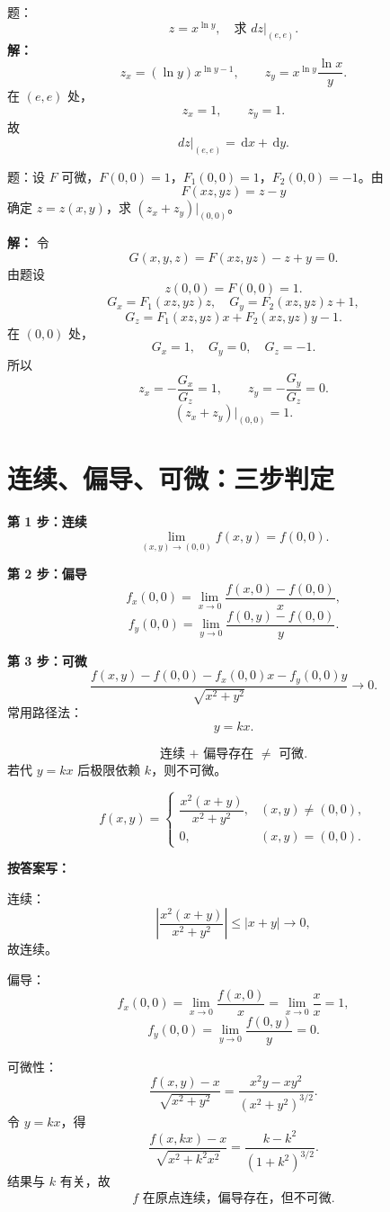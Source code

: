 \documentclass[11pt,a4paper,UTF8]{ctexart}
\newcommand{\dd}{\,\mathrm d}
\begin{document}
\begin{answerbox}[2023--2024 简答 5]
题：
\[
z=x^{\ln y},\quad \text{求 }dz\big|_{(e,e)}.
\]
\textbf{解：}
\[
z_x=(\ln y)x^{\ln y-1},\qquad
z_y=x^{\ln y}\frac{\ln x}{y}.
\]
在 \((e,e)\) 处，
\[
z_x=1,\qquad z_y=1.
\]
故
\[
\boxed{dz\big|_{(e,e)}=\dd x+\dd y}.
\]
\end{answerbox}

\begin{answerbox}[2020--2021 计算 4：隐函数一阶偏导]
题：设 \(F\) 可微，\(F(0,0)=1\)，\(F_1(0,0)=1\)，\(F_2(0,0)=-1\)。由
\[
F(xz,yz)=z-y
\]
确定 \(z=z(x,y)\)，求 \((z_x+z_y)|_{(0,0)}\)。

\textbf{解：}
令
\[
G(x,y,z)=F(xz,yz)-z+y=0.
\]
由题设
\[
z(0,0)=F(0,0)=1.
\]
\[
G_x=F_1(xz,yz)z,\quad
G_y=F_2(xz,yz)z+1,
\]
\[
G_z=F_1(xz,yz)x+F_2(xz,yz)y-1.
\]
在 \((0,0)\) 处，
\[
G_x=1,\quad G_y=0,\quad G_z=-1.
\]
所以
\[
z_x=-\frac{G_x}{G_z}=1,\qquad
z_y=-\frac{G_y}{G_z}=0.
\]
\[
\boxed{(z_x+z_y)|_{(0,0)}=1}.
\]
\end{answerbox}
\section{连续、偏导、可微：三步判定}

\begin{templatebox}[三步模板]
\textbf{第 1 步：连续}
\[
\lim_{(x,y)\to(0,0)}f(x,y)=f(0,0).
\]

\textbf{第 2 步：偏导}
\[
f_x(0,0)=\lim_{x\to0}\frac{f(x,0)-f(0,0)}{x},
\]
\[
f_y(0,0)=\lim_{y\to0}\frac{f(0,y)-f(0,0)}{y}.
\]

\textbf{第 3 步：可微}
\[
\frac{f(x,y)-f(0,0)-f_x(0,0)x-f_y(0,0)y}{\sqrt{x^2+y^2}}\to0.
\]
常用路径法：
\[
y=kx.
\]
\end{templatebox}

\begin{scorebox}[必须记住]
\[
\boxed{\text{连续 + 偏导存在 } \ne \text{ 可微}.}
\]
若代 \(y=kx\) 后极限依赖 \(k\)，则不可微。
\end{scorebox}

\begin{answerbox}[例：连续、偏导、不可微，2022--2023]
\[
f(x,y)=
\begin{cases}
\dfrac{x^2(x+y)}{x^2+y^2},&(x,y)\ne(0,0),\\
0,&(x,y)=(0,0).
\end{cases}
\]

\textbf{按答案写：}

连续：
\[
\left|\frac{x^2(x+y)}{x^2+y^2}\right|
\le |x+y|\to0,
\]
故连续。

偏导：
\[
f_x(0,0)=\lim_{x\to0}\frac{f(x,0)}x
=\lim_{x\to0}\frac{x}{x}=1,
\]
\[
f_y(0,0)=\lim_{y\to0}\frac{f(0,y)}y=0.
\]

可微性：
\[
\frac{f(x,y)-x}{\sqrt{x^2+y^2}}
=\frac{x^2y-xy^2}{(x^2+y^2)^{3/2}}.
\]
令 \(y=kx\)，得
\[
\frac{f(x,kx)-x}{\sqrt{x^2+k^2x^2}}
=\frac{k-k^2}{(1+k^2)^{3/2}}.
\]
结果与 \(k\) 有关，故
\[
\boxed{f\text{ 在原点连续，偏导存在，但不可微}.}
\]
\end{answerbox}
\end{document}
